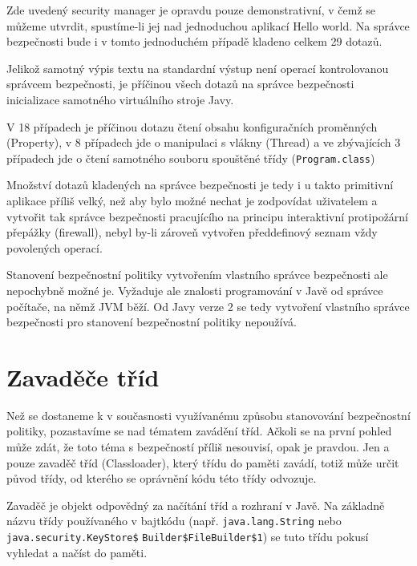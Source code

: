 Zde uvedený security manager je opravdu pouze demonstrativní, v čemž se můžeme utvrdit, spustíme-li jej nad jednoduchou aplikací Hello world. Na správce bezpečnosti bude i v tomto jednoduchém případě kladeno celkem 29 dotazů.

Jelikož samotný výpis textu na standardní výstup není operací kontrolovanou správcem bezpečnosti, je příčinou všech dotazů na správce bezpečnosti inicializace samotného virtuálního stroje Javy.

V 18 případech je příčinou dotazu čtení obsahu konfiguračních proměnných (Property), v 8 případech jde o manipulaci s vlákny (Thread) a ve zbývajících 3 případech jde o čtení samotného souboru spouštěné třídy ({\tt Program.class})

Množství dotazů kladených na správce bezpečnosti je tedy i u takto primitivní aplikace příliš velký, než aby bylo možné nechat je zodpovídat uživatelem a vytvořit tak správce bezpečnosti pracujícího na principu interaktivní protipožární přepážky (firewall), nebyl by-li zároveň vytvořen předdefinový seznam vždy povolených operací.

Stanovení bezpečnostní politiky vytvořením vlastního správce bezpečnosti ale nepochybně možné je. Vyžaduje ale znalosti programování v Javě od správce počítače, na němž JVM běží. Od Javy verze 2 se tedy vytvoření vlastního správce bezpečnosti pro stanovení bezpečnostní politiky nepoužívá.

\section{Zavaděče tříd} \label{classloader}

Než se dostaneme k v současnosti využívanému způsobu stanovování bezpečnostní politiky, pozastavíme se nad tématem zavádění tříd.
Ačkoli se na první pohled může zdát, že toto téma s bezpečností příliš nesouvisí, opak je pravdou.
Jen a pouze zavaděč tříd (Classloader), který třídu do paměti zavádí, totiž může určit původ třídy, od kterého se oprávnění kódu této třídy odvozuje.

Zavaděč je objekt odpovědný za načítání tříd a rozhraní v Javě. Na základně názvu třídy používaného v bajtkódu (např. {\tt java.lang.String} nebo {\tt java.security.KeyStore\$} {\tt Builder\$FileBuilder\$1}) se tuto třídu pokusí vyhledat a načíst do paměti. \cite{refClassLoader}

